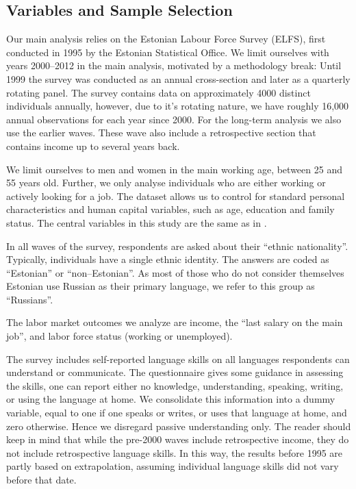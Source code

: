 \documentclass[12pt, a4paper]{article}
\begin{document}
\subsection{Variables and Sample Selection}
\label{sec:variables}

Our main analysis relies on the Estonian Labour Force Survey (ELFS),
first conducted in 1995 by the Estonian Statistical Office.  We limit
ourselves with years 2000--2012 in the main analysis, motivated by a
methodology break: Until 1999 the survey was conducted as an annual
cross-section and later as a quarterly rotating panel.  The survey
contains data on approximately 4000 distinct individuals annually,
however, due to it's rotating nature, we have roughly 16,000 annual
observations for each year since 2000.  For the long-term analysis we
also use the earlier waves.  These wave also include a retrospective
section that contains income up to several years back.

We limit ourselves to men and women in the main working age, between 25 and
55 years old.  Further, we only analyse
individuals who are either working or actively looking for a job.
The dataset allows us to control for standard personal
characteristics and human capital variables, such as age, education
and family status.  The central variables in this study are the same
as in \citet{Leping2008}.

In all waves of the survey, respondents are asked about their
``ethnic nationality''.  Typically, individuals have a single ethnic
identity.  The answers are coded as ``Estonian'' or
``non--Estonian''.  As most of those who do not consider themselves
Estonian use Russian as their primary language, we refer to this group
as ``Russians''.

The labor market outcomes we analyze are income, the ``last salary on the main job'', and
labor force status (working or unemployed).  

The survey includes self-reported language skills on all languages
respondents can understand or communicate.  The questionnaire 
gives some guidance in assessing the skills, one can report either
no knowledge, understanding, speaking, writing, or using the
language at home.  We consolidate this information into a dummy variable, equal
to one if one speaks or writes, or uses that language at
home, and zero otherwise.  Hence we disregard passive understanding
only.
  The reader should keep in mind that while the pre-2000 waves include retrospective income, they do not include retrospective language skills. In this way, the results before
1995 are partly based on extrapolation, assuming individual language
skills did not vary before that date.
\end{document}
